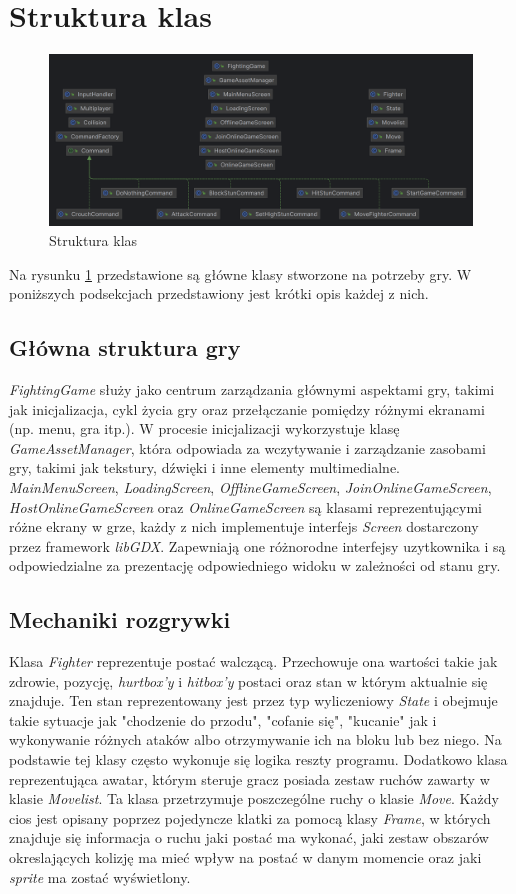 \section{Struktura klas}
\begin{figure}
	\centering
		\includegraphics[width=1\linewidth]{rys03/struktura_klas}
	\caption{Struktura klas}
	\label{fig:struktura_klas}
\end{figure}

Na rysunku \ref{fig:struktura_klas} przedstawione są główne klasy stworzone na potrzeby gry. W poniższych podsekcjach przedstawiony jest krótki opis każdej z nich.
\subsection{Główna struktura gry}
\emph{FightingGame} służy jako centrum zarządzania głównymi aspektami gry, takimi jak inicjalizacja, cykl życia gry oraz przełączanie pomiędzy różnymi ekranami (np. menu, gra itp.). W procesie inicjalizacji wykorzystuje klasę \emph{GameAssetManager}, która odpowiada za wczytywanie i zarządzanie zasobami gry, takimi jak tekstury, dźwięki i inne elementy multimedialne. \emph{MainMenuScreen}, \emph{LoadingScreen}, \emph{OfflineGameScreen}, \emph{JoinOnlineGameScreen}, \emph{HostOnlineGameScreen} oraz \emph{OnlineGameScreen} są klasami reprezentującymi różne ekrany w grze, każdy z nich implementuje interfejs \emph{Screen} dostarczony przez framework \emph{libGDX}. Zapewniają one różnorodne interfejsy uzytkownika i są odpowiedzialne za prezentację odpowiedniego widoku w zależności od stanu gry.

\subsection{Mechaniki rozgrywki}
Klasa \emph{Fighter} reprezentuje postać walczącą. Przechowuje ona wartości takie jak zdrowie, pozycję, \emph{hurtbox'y} i \emph{hitbox'y} postaci oraz stan w którym aktualnie się znajduje. Ten stan reprezentowany jest przez typ wyliczeniowy \emph{State} i obejmuje takie sytuacje jak "chodzenie do przodu", "cofanie się", "kucanie" jak i wykonywanie różnych ataków albo otrzymywanie ich na bloku lub bez niego. Na podstawie tej klasy często wykonuje się logika reszty programu. Dodatkowo klasa reprezentująca awatar, którym steruje gracz posiada zestaw ruchów zawarty w klasie \emph{Movelist}. Ta klasa przetrzymuje poszczególne ruchy o klasie \emph{Move}. Każdy cios jest opisany poprzez pojedyncze klatki za pomocą klasy \emph{Frame}, w których znajduje się informacja o ruchu jaki postać ma wykonać, jaki zestaw obszarów okreslających kolizję ma mieć wpływ na postać w danym momencie oraz jaki \emph{sprite} ma zostać wyświetlony.

